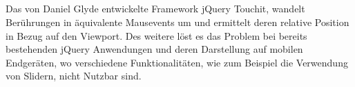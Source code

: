 	\subsection{}
	Das von Daniel Glyde entwickelte Framework jQuery Touchit, wandelt Berührungen in äquivalente Mausevents um und ermittelt 	deren relative Position in Bezug auf den Viewport. Des weitere löst es das Problem bei bereits bestehenden jQuery 				Anwendungen und deren Darstellung auf mobilen Endgeräten, wo verschiedene Funktionalitäten, wie zum Beispiel die 			Verwendung von Slidern, nicht Nutzbar sind.
	
	
	
	
